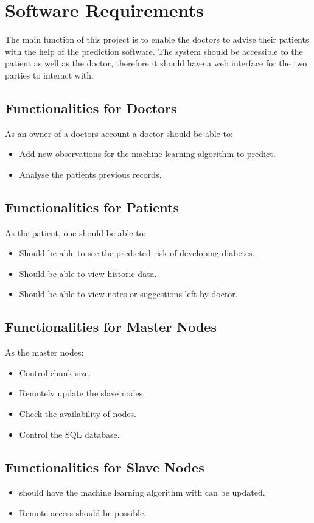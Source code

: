 \documentclass[12pt]{article}
\begin{document}
\newpage
\section{Software Requirements}
The main function of this project is to enable the doctors to advise their patients with the help of the prediction software. The system should be accessible to the patient as well as the doctor, therefore it should have a web interface for the two parties to interact with. 

\subsection{Functionalities for Doctors}
As an owner of a doctors account a doctor should be able to:
\begin{itemize}
\item Add new observations for the machine learning algorithm to predict.
\item Analyse the patients previous records.
\end{itemize}

\subsection{Functionalities for Patients}
As the patient, one should be able to:
\begin{itemize}
\item Should be able to see the predicted risk of developing diabetes.
\item Should be able to view historic data.
\item Should be able to view notes or suggestions left by doctor.
\end{itemize}

\subsection{Functionalities for Master Nodes}
As the master nodes:
\begin{itemize}
\item Control chunk size.
\item Remotely update the slave nodes.
\item Check the availability of nodes.
\item Control the SQL database.
\end{itemize}

\subsection{Functionalities for Slave Nodes}
\begin{itemize}
\item should have the machine learning algorithm with can be updated.
\item Remote access should be possible.
\end{itemize}
\end{document}

